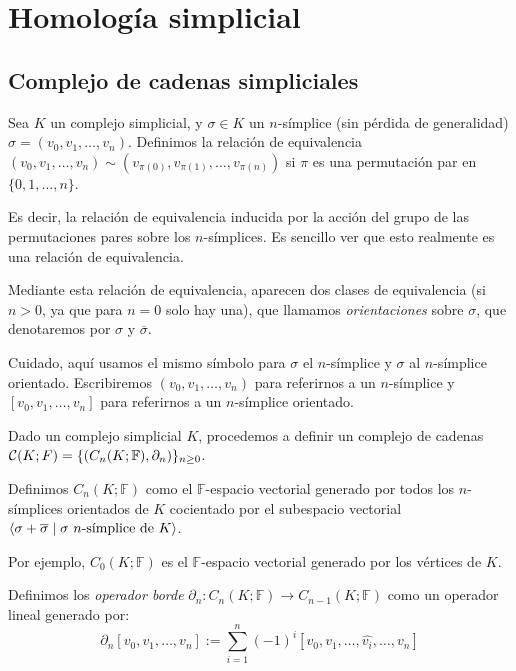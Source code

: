 \documentclass[HS.tex]{subfiles}
\begin{document}
\chapter{Homología simplicial}


\section{Complejo de cadenas simpliciales}
\begin{defi}
Sea $K$ un  complejo simplicial, y $\sigma \in K$ un $n$-símplice (sin pérdida de generalidad) $\sigma = (v_0,v_1,\dots,v_n)$.
Definimos la relación de equivalencia $(v_0,v_1,\dots,v_n) \sim (v_{\pi(0)},v_{\pi(1)},\dots,v_{\pi(n)})$ si $\pi$ es una permutación par en $\{0,1,\dots,n\}$.
\end{defi}
Es decir, la relación de equivalencia inducida por la acción del grupo de las permutaciones pares sobre los $n$-símplices.
Es sencillo ver que esto realmente es una relación de equivalencia.

Mediante esta relación de equivalencia, aparecen dos clases de equivalencia (si $n > 0$, ya que para $n=0$ solo hay una), que llamamos \emph{orientaciones} sobre $\sigma$, que denotaremos por $\sigma$ y $\overline{\sigma}$.

Cuidado, aquí usamos el mismo símbolo para $\sigma$ el $n$-símplice y $\sigma$ al $n$-símplice orientado.
Escribiremos $(v_0,v_1,\dots,v_n)$ para referirnos a un $n$-símplice y $[v_0,v_1,\dots,v_n]$ para referirnos a un $n$-símplice orientado.

Dado un complejo simplicial $K$, procedemos a definir un complejo de cadenas $\mathcal{C}(K;F)=\{(C_n(K;\mathbb{F}), \partial_n)\}_{n\geq 0}$. 
\begin{defi}
Definimos $C_n(K;\mathbb{F})$ como el $\mathbb{F}$-espacio vectorial generado por todos los $n$-símplices orientados de $K$ cocientado por el subespacio vectorial $\gene{\sigma + \overline{\sigma} \mid \sigma\ n\text{-símplice de }K}$.
\end{defi}
Por ejemplo, $C_0(K;\mathbb{F})$ es el $\mathbb{F}$-espacio vectorial generado por los vértices de $K$.

\begin{defi}
Definimos los \emph{operador borde} $\partial_n \colon C_n(K; \mathbb{F}) \to C_{n-1}(K; \mathbb{F})$ como un operador lineal generado por:
\[ \partial_n[v_0,v_1,\dots,v_n] := \sum_{i=1}^n (-1)^i [v_0,v_1,\dots,\widehat{v_i},\dots,v_n]\]
\end{defi}
\end{document}

